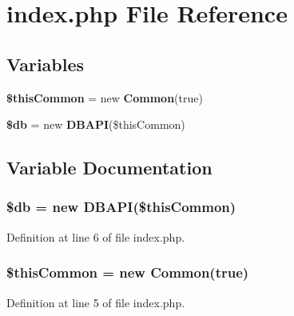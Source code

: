 \section{index.\+php File Reference}
\label{index_8php}
\subsection*{Variables}
\begin{DoxyCompactItemize}
\item 
{\bf \$this\+Common} = new {\bf Common}(true)
\item 
{\bf \$db} = new {\bf D\+B\+A\+PI}(\$this\+Common)
\end{DoxyCompactItemize}


\subsection{Variable Documentation}
\subsubsection[{\$db}]{\setlength{\rightskip}{0pt plus 5cm}\$db = new {\bf D\+B\+A\+PI}(\$this\+Common)}\label{index_8php_a1fa3127fc82f96b1436d871ef02be319}


Definition at line 6 of file index.\+php.

\subsubsection[{\$this\+Common}]{\setlength{\rightskip}{0pt plus 5cm}\$this\+Common = new {\bf Common}(true)}\label{index_8php_a2dc37683cec5a169d791007363950944}


Definition at line 5 of file index.\+php.


